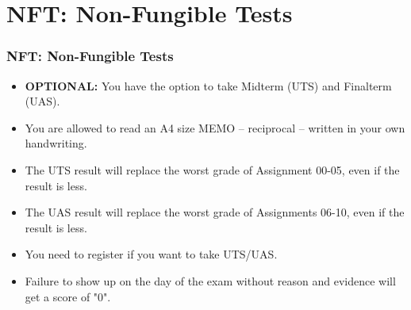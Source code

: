 \documentclass[aspectratio=169, xcolor=table, notheorems, hyperref={pdfpagelabels=false}]{beamer}
\begin{document}
\section{NFT: Non-Fungible Tests}
\begin{frame}
\frametitle{NFT: Non-Fungible Tests}
\begin{itemize}
\item \textbf{OPTIONAL:} You have the option to take Midterm (UTS) and Finalterm (UAS).
\item You are allowed to read an A4 size MEMO -- reciprocal -- written in your own handwriting.
\item The UTS result will replace the worst grade of Assignment 00-05, 
      even if the result is less.
\item The UAS result will replace the worst grade of Assignments 06-10,
      even if the result is less.
\item You need to register if you want to take UTS/UAS.
\item Failure to show up on the day of the exam without reason and evidence will get a score of "0".
\end{itemize}
\end{frame}

\end{document}
